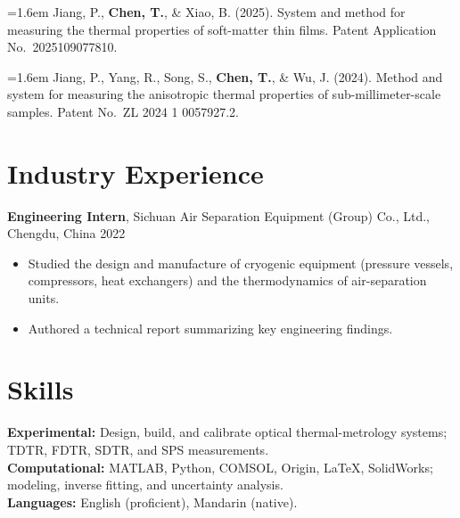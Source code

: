 \documentclass[10pt,a4paper]{article}
\newcommand{\pubitem}[1]{\par\noindent\hangindent=1.6em\hangafter=1 #1\par\addvspace{3pt}}
\begin{document}
\pubitem{Jiang, P., \textbf{Chen, T.}, \& Xiao, B. (2025). System and method for measuring the thermal properties of soft-matter thin films. Patent Application No.\ 2025109077810.}

\pubitem{Jiang, P., Yang, R., Song, S., \textbf{Chen, T.}, \& Wu, J. (2024). Method and system for measuring the anisotropic thermal properties of sub-millimeter-scale samples. Patent No.\ ZL 2024 1 0057927.2.}

\section{Industry Experience}
\textbf{Engineering Intern}, Sichuan Air Separation Equipment (Group) Co., Ltd., Chengdu, China \hfill 2022
\begin{itemize}
  \item Studied the design and manufacture of cryogenic equipment (pressure vessels, compressors, heat exchangers) and the thermodynamics of air-separation units.
  \item Authored a technical report summarizing key engineering findings.
\end{itemize}

\section{Skills}
\textbf{Experimental:} Design, build, and calibrate optical thermal-metrology systems; TDTR, FDTR, SDTR, and SPS measurements.\\[2pt]
\textbf{Computational:} MATLAB, Python, COMSOL, Origin, \LaTeX, SolidWorks; modeling, inverse fitting, and uncertainty analysis.\\[2pt]
\textbf{Languages:} English (proficient), Mandarin (native).
\end{document}
